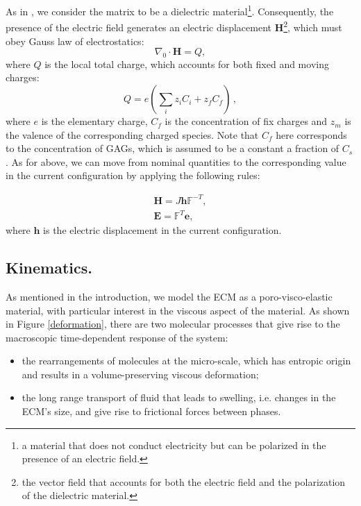 \documentclass[runningheads]{llncs}
\newcommand{\F}{\ensuremath{\mathbb{F}}}
\begin{document}
As in \cite{Reviewpolyel}, we consider the matrix to be a dielectric material\footnote{a material that does not conduct electricity but can be polarized in the presence of an electric field.}. Consequently, the presence of the electric field generates an electric displacement $\mathbf{H}$\footnote{the vector field that accounts for both the electric field and the polarization of the dielectric material.}, which must obey Gauss law of electrostatics:
\begin{equation}
\nabla_0 \cdot \mathbf{H}= Q,
\label{gauss}
\end{equation}
where $Q$ is the local total charge, which accounts for both fixed and moving charges:
\begin{equation}
Q = e\left(\sum\limits_{i} z_i C_i+z_f C_{f}\right)\, , 
\end{equation}
where $e$ is the elementary charge, $C_f$ is the concentration of fix charges and $z_m$ is the valence of the corresponding charged species. Note that $C_f$ here corresponds to the concentration of GAGs, which is assumed to be a constant a fraction of $C_s$. As for above, we can move from nominal quantities to the corresponding value in the current configuration by applying the following rules:

\begin{eqnarray}
\mathbf{H} = J \mathbf{h}\F^{-T},\\
\mathbf{E} = \F^T \mathbf{e},
\end{eqnarray}
where $\mathbf{h}$ is the electric displacement in the current configuration.

\subsection{Kinematics.}
\label{kin}

As mentioned in the introduction, we model the ECM as a poro-visco-elastic material, with particular interest in the viscous aspect of the material. As shown in Figure \ref{deformation}, there are two molecular processes that give rise to the macroscopic time-dependent response of the system: 
\begin{itemize}
	\item [1.] the rearrangements of molecules at the micro-scale,  which has entropic origin and results in a volume-preserving viscous deformation;
	\item[2.] the long range transport of fluid that leads to swelling, i.e. changes in the ECM's size, and give rise to frictional forces between phases. 
\end{itemize}
\end{document}
